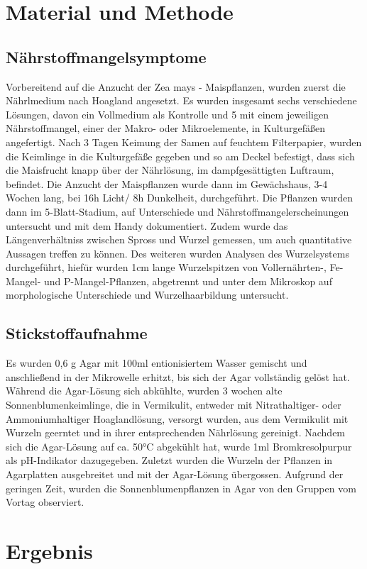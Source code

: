 \documentclass[10pt,a4paper]{article}
\begin{document}
	
	\section{Material und Methode}
		\subsection{Nährstoffmangelsymptome}
		Vorbereitend auf die Anzucht der Zea mays - Maispflanzen, wurden zuerst die Nährlmedium nach Hoagland angesetzt. Es wurden insgesamt sechs verschiedene Lösungen, davon ein Vollmedium als Kontrolle und 5 mit einem jeweiligen Nährstoffmangel, einer der Makro- oder Mikroelemente, in Kulturgefäßen angefertigt. Nach 3 Tagen Keimung der Samen auf feuchtem Filterpapier, wurden die Keimlinge in die Kulturgefäße gegeben und so am Deckel befestigt, dass sich die Maisfrucht knapp über der Nährlösung, im dampfgesättigten Luftraum, befindet. Die Anzucht der Maispflanzen wurde dann im Gewächshaus, 3-4 Wochen lang, bei 16h Licht/ 8h Dunkelheit, durchgeführt. Die Pflanzen wurden dann im 5-Blatt-Stadium, auf Unterschiede und Nährstoffmangelerscheinungen untersucht und mit dem Handy dokumentiert. Zudem wurde das Längenverhältniss zwischen Spross und Wurzel gemessen, um auch quantitative Aussagen treffen zu können. Des weiteren wurden Analysen des Wurzelsystems durchgeführt, hiefür wurden 1cm lange Wurzelspitzen von Vollernährten-, Fe-Mangel- und P-Mangel-Pflanzen, abgetrennt und unter dem Mikroskop auf morphologische Unterschiede und Wurzelhaarbildung untersucht.
		\subsection{Stickstoffaufnahme}
		Es wurden 0,6 g Agar mit 100ml entionisiertem Wasser gemischt und anschließend in der Mikrowelle erhitzt, bis sich der Agar vollständig gelöst hat. Während die Agar-Lösung sich abkühlte, wurden 3 wochen alte Sonnenblumenkeimlinge, die in Vermikulit, entweder mit Nitrathaltiger- oder Ammoniumhaltiger Hoaglandlösung, versorgt wurden, aus dem Vermikulit mit Wurzeln geerntet und in ihrer entsprechenden Nährlösung gereinigt. Nachdem sich die Agar-Lösung auf ca. 50°C abgekühlt hat, wurde 1ml Bromkresolpurpur als pH-Indikator dazugegeben. Zuletzt wurden die Wurzeln der Pflanzen in Agarplatten ausgebreitet und mit der Agar-Lösung übergossen. Aufgrund der geringen Zeit, wurden die Sonnenblumenpflanzen in Agar von den Gruppen vom Vortag observiert.
	
	\section{Ergebnis}
\end{document}
